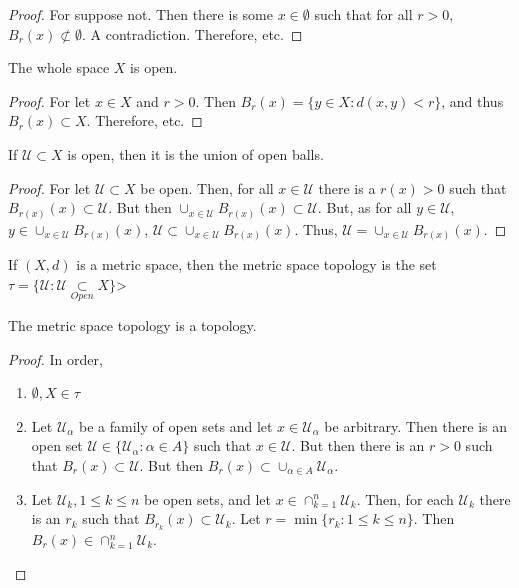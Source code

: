 \documentclass[crop=false,class=book,oneside]{standalone}
\begin{document}
            \begin{proof}
            For suppose not. Then there is some $x\in \emptyset$ such that for all $r>0$, $B_{r}(x)\not\subset \emptyset$. A contradiction. Therefore, etc.
            \end{proof}
            \begin{theorem}
            The whole space $X$ is open.
            \end{theorem}
            \begin{proof}
            For let $x\in X$ and $r>0$. Then $B_{r}(x) = \{y\in X:d(x,y)<r\}$, and thus $B_{r}(x)\subset X$. Therefore, etc.
            \end{proof}
            \begin{theorem}
            If $\mathcal{U}\subset X$ is open, then it is the union of open balls.
            \end{theorem}
            \begin{proof}
            For let $\mathcal{U} \subset X$ be open. Then, for all $x\in \mathcal{U}$ there is a $r(x)>0$ such that $B_{r(x)}(x) \subset \mathcal{U}$. But then $\cup_{x\in \mathcal{U}}B_{r(x)}(x)\subset \mathcal{U}$. But, as for all $y\in \mathcal{U}$, $y\in \cup_{x\in \mathcal{U}}B_{r(x)}(x)$, $\mathcal{U} \subset \cup_{x\in \mathcal{U}}B_{r(x)}(x)$. Thus, $\mathcal{U}= \cup_{x\in \mathcal{U}}B_{r(x)}(x)$.
            \end{proof}
            \begin{definition}
            If $(X,d)$ is a metric space, then the metric space topology is the set $\tau = \{\mathcal{U}:\mathcal{U}\underset{Open}\subset X\}$>
            \end{definition}
            \begin{theorem}
            The metric space topology is a topology.
            \end{theorem}
            \begin{proof}
            In order,
            \begin{enumerate}
            \item $\emptyset, X \in \tau$
            \item Let $\mathcal{U}_{\alpha}$ be a family of open sets and let $x\in \mathcal{U}_{\alpha}$ be arbitrary. Then there is an open set $\mathcal{U} \in \{\mathcal{U}_{\alpha}:\alpha\in A\}$ such that $x\in \mathcal{U}$. But then there is an $r>0$ such that $B_{r}(x)\subset\mathcal{U}$. But then $B_{r}(x) \subset \cup_{\alpha \in A}\mathcal{U}_{\alpha}$.
            \item Let $\mathcal{U}_{k}, 1\leq k \leq n$ be open sets, and let $x\in \cap_{k=1}^{n} \mathcal{U}_k$. Then, for each $\mathcal{U}_k$ there is an $r_{k}$ such that $B_{r_k}(x)\subset \mathcal{U}_{k}$. Let $r = \min\{r_k:1\leq k \leq n\}$. Then $B_{r}(x) \in \cap_{k=1}^{n}\mathcal{U}_k$.
            \end{enumerate}
            \end{proof}
\end{document}
